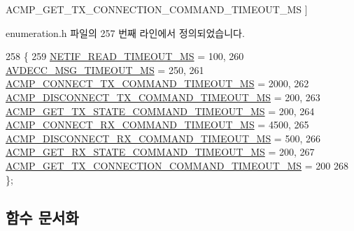 \begin{Desc}
\begin{description}
{A\+C\+M\+P\+\_\+\+G\+E\+T\+\_\+\+T\+X\+\_\+\+C\+O\+N\+N\+E\+C\+T\+I\+O\+N\+\_\+\+C\+O\+M\+M\+A\+N\+D\+\_\+\+T\+I\+M\+E\+O\+U\+T\+\_\+\+MS\hypertarget{namespaceavdecc__lib_a5672955abd1a38146bde28647367857eae76cd81da0e41f56dca5dc88dda423a1}{}\label{namespaceavdecc__lib_a5672955abd1a38146bde28647367857eae76cd81da0e41f56dca5dc88dda423a1}
}]\end{description}
\end{Desc}


enumeration.\+h 파일의 257 번째 라인에서 정의되었습니다.


\begin{DoxyCode}
258 \{
259     \hyperlink{namespaceavdecc__lib_a5672955abd1a38146bde28647367857ea9f482edcc88a7e03cdc36932fb9fa8fd}{NETIF\_READ\_TIMEOUT\_MS} = 100, 
260     \hyperlink{namespaceavdecc__lib_a5672955abd1a38146bde28647367857ea3e235a94e9e3d91317afd7bdbb3844c1}{AVDECC\_MSG\_TIMEOUT\_MS} = 250, 
261     \hyperlink{namespaceavdecc__lib_a5672955abd1a38146bde28647367857ead2c9cdd3767fdcfc7973bffe6fad27e6}{ACMP\_CONNECT\_TX\_COMMAND\_TIMEOUT\_MS} = 2000,
262     \hyperlink{namespaceavdecc__lib_a5672955abd1a38146bde28647367857ea119f46688bfcc69a5bb7c9887a0fbe7e}{ACMP\_DISCONNECT\_TX\_COMMAND\_TIMEOUT\_MS} = 200,
263     \hyperlink{namespaceavdecc__lib_a5672955abd1a38146bde28647367857ea429b49b68e80bdbcc480d2b2ba663771}{ACMP\_GET\_TX\_STATE\_COMMAND\_TIMEOUT\_MS} = 200,
264     \hyperlink{namespaceavdecc__lib_a5672955abd1a38146bde28647367857ea6c03d3112f3139618f56b82329572bc4}{ACMP\_CONNECT\_RX\_COMMAND\_TIMEOUT\_MS} = 4500,
265     \hyperlink{namespaceavdecc__lib_a5672955abd1a38146bde28647367857eaeaaa3d4bbcbc28fb10d8511ac3d590cc}{ACMP\_DISCONNECT\_RX\_COMMAND\_TIMEOUT\_MS} = 500,
266     \hyperlink{namespaceavdecc__lib_a5672955abd1a38146bde28647367857ea1686702fc28aaf14397624208eaab4e9}{ACMP\_GET\_RX\_STATE\_COMMAND\_TIMEOUT\_MS} = 200,
267     \hyperlink{namespaceavdecc__lib_a5672955abd1a38146bde28647367857eae76cd81da0e41f56dca5dc88dda423a1}{ACMP\_GET\_TX\_CONNECTION\_COMMAND\_TIMEOUT\_MS} = 200
268 \};
\end{DoxyCode}


\subsection{함수 문서화}
